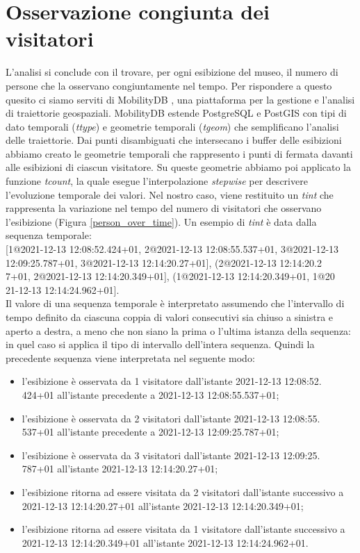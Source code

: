 \documentclass[12pt]{article}
\begin{document}
\section{Osservazione congiunta dei visitatori}
L'analisi si conclude con il trovare, per ogni esibizione del museo, il numero di persone che la osservano congiuntamente nel tempo.
Per rispondere a questo quesito ci siamo serviti di MobilityDB \cite{MobilityDBTODS2020}, una piattaforma per la gestione e l'analisi di traiettorie geospaziali.
MobilityDB estende PostgreSQL e PostGIS con tipi di dato temporali (\emph{ttype}) e geometrie temporali (\emph{tgeom}) che semplificano l'analisi delle traiettorie.
Dai punti disambiguati che intersecano i buffer delle esibizioni abbiamo creato le geometrie temporali che rappresento i punti di fermata davanti alle esibizioni di ciascun visitatore.
Su queste geometrie abbiamo poi applicato la funzione \emph{tcount}, la quale esegue l'interpolazione \emph{stepwise} per descrivere l'evoluzione temporale dei valori.
Nel nostro caso, viene restituito un \emph{tint} che rappresenta la variazione nel tempo del numero di visitatori che osservano l'esibizione (Figura \ref{person_over_time}).
Un esempio di \emph{tint} è data dalla sequenza temporale: \\
{[1@2021-12-13 12:08:52.424+01, 2@2021-12-13 12:08:55.537+01, 3@2021-12-13 12:09:25.787+01, 3@2021-12-13 12:14:20.27+01], (2@2021-12-13 12:14:20.2\\7+01, 2@2021-12-13 12:14:20.349+01], (1@2021-12-13 12:14:20.349+01, 1@20\\21-12-13 12:14:24.962+01]}.\\
Il valore di una sequenza temporale è interpretato assumendo che l'intervallo di tempo definito da ciascuna coppia di valori consecutivi sia chiuso a sinistra e aperto a destra, a meno che non siano la prima o l'ultima istanza della sequenza: in quel caso si applica il tipo di intervallo dell'intera sequenza.
Quindi la precedente sequenza viene interpretata nel seguente modo:
\begin{itemize}
    \item l'esibizione è osservata da 1 visitatore dall'istante 2021-12-13 12:08:52.\\424+01 all'istante precedente a 2021-12-13 12:08:55.537+01;
    \item l'esibizione è osservata da 2 visitatori dall'istante 2021-12-13 12:08:55.\\537+01 all'istante precedente a 2021-12-13 12:09:25.787+01;
    \item l'esibizione è osservata da 3 visitatori dall'istante 2021-12-13 12:09:25.\\787+01 all'istante 2021-12-13 12:14:20.27+01;
    \item l'esibizione ritorna ad essere visitata da 2 visitatori dall'istante successivo a 2021-12-13 12:14:20.27+01 all'istante 2021-12-13 12:14:20.349+01;
    \item l'esibizione ritorna ad essere visitata da 1 visitatore dall'istante successivo a 2021-12-13 12:14:20.349+01 all'istante 2021-12-13 12:14:24.962+01.
\end{itemize}
\end{document}
